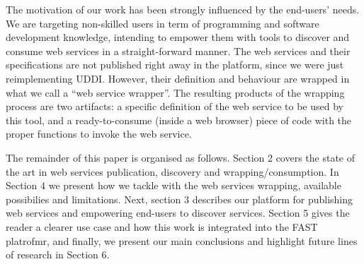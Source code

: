 The motivation of our work has been strongly influenced by the end-users' needs. We are targeting non-skilled users in term of programming and software development knowledge, intending to empower them with tools to discover and consume web services in a straight-forward manner. The web services and their specifications are not published right away in the platform, since we were just reimplementing UDDI. However, their definition and behaviour are wrapped in what we call a ``web service wrapper''. The resulting products of the wrapping process are two artifacts: a specific definition of the web service to be used by this tool, and a ready-to-consume (inside a web browser) piece of code with the proper functions to invoke the web service.

The remainder of this paper is organised as follows. Section 2 covers the state of the art in web services publication, discovery and wrapping/consumption. In Section 4 we present how we tackle with the web services wrapping, available possibilies and limitations. Next, section 3 describes our platform for publishing web services and empowering end-users to discover services. Section 5 gives the reader a clearer use case and how this work is integrated into the FAST platrofmr, and finally, we present our main conclusions and highlight future lines of research in Section 6.

